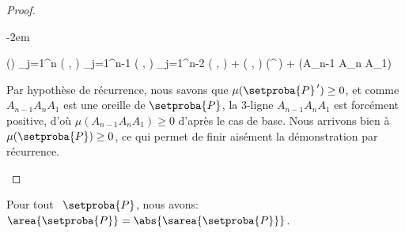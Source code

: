 \begin{proof}
\begin{itemize}
		\leavevmode\kern-2em%
		\begin{stepcalc}[style=ar*]
			\mu()
		\explnext{}
			\dsum_{j=1}^{n} \det \big(  ,  \big)
		          {}
			\dsum_{j=1}^{n-1} \det \big(  ,  \big)
		\explnext{}
			\dsum_{j=1}^{n-2} \det \big(  ,  \big)
			+
			\det \big(  ,  \big)
			\mu(^{\,\prime})
			+
			\mu(A_{n-1} A_n A_1)
		\end{stepcalc}


		\noindent
		Par hypothèse de récurrence, nous savons que
		$\mu(\setproba{P}^{\,\prime}) \geq 0$,
		et comme $A_{n-1} A_n A_1$ est une oreille de $\setproba{P}$, la $3$-ligne $A_{n-1} A_n A_1$ est forcément positive, d'où $\mu(A_{n-1} A_n A_1) \geq 0$ d'après le cas de base.
		Nous arrivons bien à $\mu(\setproba{P}) \geq 0$, ce qui permet de finir aisément la démonstration par récurrence.
	\end{itemize}
	
	\null\vspace{-6ex}
\end{proof}




\begin{fact} \label{sarea-ngone}
    Pour tout \ngone\ $\setproba{P}$, nous avons:
    $\area{\setproba{P}} = \abs{\sarea{\setproba{P}}}$.
\end{fact}


